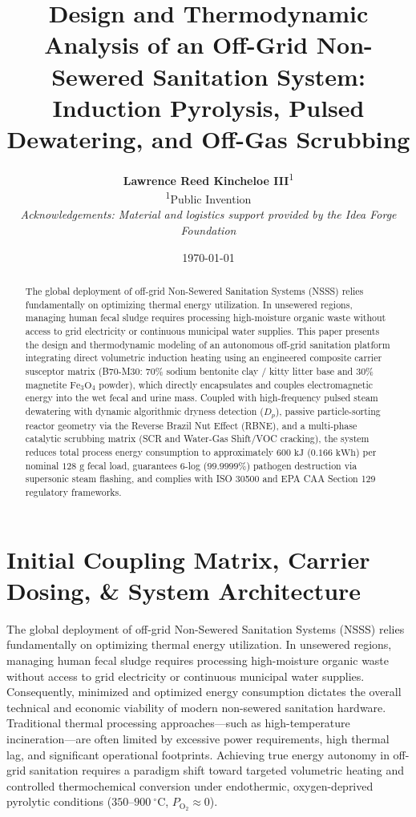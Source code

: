 \documentclass[10pt,twocolumn,a4paper]{article}
\title{\textbf{Design and Thermodynamic Analysis of an Off-Grid Non-Sewered Sanitation System: Induction Pyrolysis, Pulsed Dewatering, and Off-Gas Scrubbing}}
\author{
    \textbf{Lawrence Reed Kincheloe III}\textsuperscript{1} \\
    \small \textsuperscript{1}Public Invention \\
    \small \textit{Acknowledgements: Material and logistics support provided by the Idea Forge Foundation}
}
\date{\today}
\begin{document}
\maketitle

\begin{abstract}
The global deployment of off-grid Non-Sewered Sanitation Systems (NSSS) relies fundamentally on optimizing thermal energy utilization. In unsewered regions, managing human fecal sludge requires processing high-moisture organic waste without access to grid electricity or continuous municipal water supplies. This paper presents the design and thermodynamic modeling of an autonomous off-grid sanitation platform integrating direct volumetric induction heating using an engineered composite carrier susceptor matrix (B70-M30: 70\% sodium bentonite clay / kitty litter base and 30\% magnetite $\text{Fe}_3\text{O}_4$ powder), which directly encapsulates and couples electromagnetic energy into the wet fecal and urine mass. Coupled with high-frequency pulsed steam dewatering with dynamic algorithmic dryness detection ($D_p$), passive particle-sorting reactor geometry via the Reverse Brazil Nut Effect (RBNE), and a multi-phase catalytic scrubbing matrix (SCR and Water-Gas Shift/VOC cracking), the system reduces total process energy consumption to approximately $600\text{ kJ}$ ($0.166\text{ kWh}$) per nominal $128\text{ g}$ fecal load, guarantees 6-log ($99.9999\%$) pathogen destruction via supersonic steam flashing, and complies with ISO 30500 and EPA CAA Section 129 regulatory frameworks.
\end{abstract}

\section{Initial Coupling Matrix, Carrier Dosing, \& System Architecture}

The global deployment of off-grid Non-Sewered Sanitation Systems (NSSS) relies fundamentally on optimizing thermal energy utilization. In unsewered regions, managing human fecal sludge requires processing high-moisture organic waste without access to grid electricity or continuous municipal water supplies. Consequently, minimized and optimized energy consumption dictates the overall technical and economic viability of modern non-sewered sanitation hardware. Traditional thermal processing approaches—such as high-temperature incineration—are often limited by excessive power requirements, high thermal lag, and significant operational footprints. Achieving true energy autonomy in off-grid sanitation requires a paradigm shift toward targeted volumetric heating and controlled thermochemical conversion under endothermic, oxygen-deprived pyrolytic conditions ($350\text{--}900~^\circ\text{C}$, $P_{\text{O}_2} \approx 0$).
\end{document}

